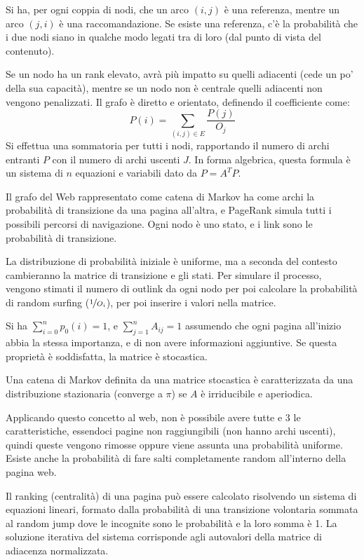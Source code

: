 Si ha, per ogni coppia di nodi, che un arco $(i, j)$ è una referenza, mentre un arco $(j, i)$ è una raccomandazione. Se esiste una referenza, c'è la probabilità che i due nodi siano in qualche modo legati tra di loro (dal punto di vista del contenuto).

Se un nodo ha un rank elevato, avrà più impatto su quelli adiacenti (cede un po' della sua capacità), mentre se un nodo non è centrale quelli adiacenti non vengono penalizzati. Il grafo è diretto e orientato, definendo il coefficiente come:
$$P(i) = \sum_{(i, j) \in E} \frac{P(j)}{O_j}$$
Si effettua una sommatoria per tutti i nodi, rapportando il numero di archi entranti $P$ con il numero di archi uscenti $J$. In forma algebrica, questa formula è un sistema di $n$ equazioni e variabili dato da $P = A^TP$.

Il grafo del Web rappresentato come catena di Markov ha come archi la probabilità di transizione da una pagina all'altra, e PageRank simula tutti i possibili percorsi di navigazione. Ogni nodo è uno stato, e i link sono le probabilità di transizione. 

La distribuzione di probabilità iniziale è uniforme, ma a seconda del 
contesto cambieranno la matrice di transizione e gli stati. Per simulare il 
processo, vengono stimati il numero di outlink da ogni nodo per poi 
calcolare la probabilità di random surfing ($\nicefrac{1}{O_i}$), per poi 
inserire i valori nella matrice.

Si ha $\sum_{i=0}^{n} p_0(i) = 1$, e $\sum_{j=1}^{n} A_{ij}  = 1$ assumendo che ogni pagina all'inizio abbia la stessa importanza, e di non avere informazioni aggiuntive. Se questa proprietà è soddisfatta, la matrice è stocastica. 

Una catena di Markov definita da una matrice stocastica è caratterizzata da una distribuzione stazionaria (converge a $\pi$) se $A$ è irriducibile e aperiodica. 

Applicando questo concetto al web, non è possibile avere tutte e 3 le caratteristiche, essendoci pagine non raggiungibili (non hanno archi uscenti), quindi queste vengono rimosse oppure viene assunta una probabilità uniforme. Esiste anche la probabilità di fare salti completamente random all'interno della pagina web. 

Il ranking (centralità) di una pagina può essere calcolato risolvendo un sistema di equazioni lineari, formato dalla probabilità di una transizione volontaria sommata al random jump dove le incognite sono le probabilità e la loro somma è 1. La soluzione iterativa del sistema corrisponde agli autovalori della matrice di adiacenza normalizzata. 

